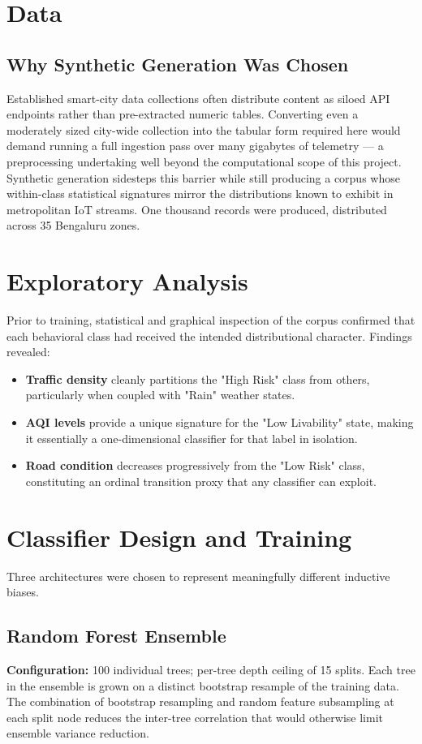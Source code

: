 \documentclass[conference]{IEEEtran}
\begin{document}
\section{Data}
\subsection{Why Synthetic Generation Was Chosen}
Established smart-city data collections often distribute content as siloed API endpoints rather than pre-extracted numeric tables. Converting even a moderately sized city-wide collection into the tabular form required here would demand running a full ingestion pass over many gigabytes of telemetry --- a preprocessing undertaking well beyond the computational scope of this project. Synthetic generation sidesteps this barrier while still producing a corpus whose within-class statistical signatures mirror the distributions known to exhibit in metropolitan IoT streams. One thousand records were produced, distributed across 35 Bengaluru zones.

\section{Exploratory Analysis}
Prior to training, statistical and graphical inspection of the corpus confirmed that each behavioral class had received the intended distributional character. Findings revealed:
\begin{itemize}
    \item \textbf{Traffic density} cleanly partitions the "High Risk" class from others, particularly when coupled with "Rain" weather states.
    \item \textbf{AQI levels} provide a unique signature for the "Low Livability" state, making it essentially a one-dimensional classifier for that label in isolation.
    \item \textbf{Road condition} decreases progressively from the "Low Risk" class, constituting an ordinal transition proxy that any classifier can exploit.
\end{itemize}

\section{Classifier Design and Training}
Three architectures were chosen to represent meaningfully different inductive biases.
\subsection{Random Forest Ensemble}
\textbf{Configuration:} 100 individual trees; per-tree depth ceiling of 15 splits. Each tree in the ensemble is grown on a distinct bootstrap resample of the training data. The combination of bootstrap resampling and random feature subsampling at each split node reduces the inter-tree correlation that would otherwise limit ensemble variance reduction.
\end{document}
